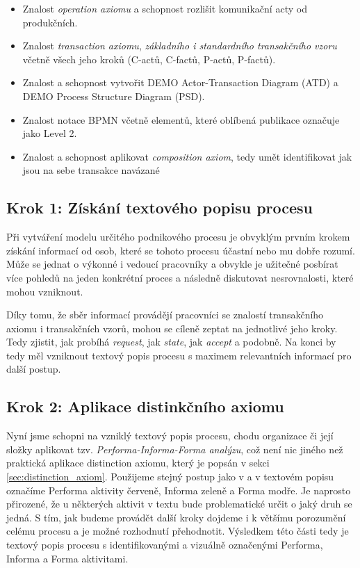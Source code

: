 \documentclass[]{article}
\begin{document}
\begin{itemize}
\item Znalost \textit{operation axiomu} a schopnost rozlišit komunikační acty od produkčních.
\item Znalost \textit{transaction axiomu}, \textit{základního i standardního transakčního vzoru} včetně všech jeho kroků (C-actů, C-factů, P-actů, P-factů).
\item Znalost a schopnost vytvořit DEMO Actor-Transaction Diagram (ATD) a DEMO Process Structure Diagram (PSD).
\item Znalost notace BPMN včetně elementů, které oblíbená publikace \cite{Silver2011} označuje jako Level 2.
\item Znalost a schopnost aplikovat \textit{composition axiom}, tedy umět identifikovat jak jsou na sebe transakce navázané
\end{itemize}

\subsection{Krok 1: Získání textového popisu procesu}
Při vytváření modelu určitého podnikového procesu je obvyklým prvním krokem získání informací od osob, které se tohoto procesu účastní nebo mu dobře rozumí. Může se jednat o výkonné i vedoucí pracovníky a obvykle je užitečné posbírat více pohledů na jeden konkrétní proces a následně diskutovat nesrovnalosti, které mohou vzniknout.

Díky tomu, že sběr informací provádějí pracovníci se znalostí transakčního axiomu i transakčních vzorů, mohou se cíleně zeptat na jednotlivé jeho kroky. Tedy zjistit, jak probíhá \textit{request}, jak \textit{state}, jak \textit{accept} a podobně. Na konci by tedy měl vzniknout textový popis procesu s maximem relevantních informací pro další postup.

\subsection{Krok 2: Aplikace distinkčního axiomu}
Nyní jsme schopni na vzniklý textový popis procesu, chodu organizace či její složky aplikovat tzv. \textit{Performa-Informa-Forma analýzu}, což není nic jiného než praktická aplikace distinction axiomu, který je popsán v sekci \ref{sec:distinction_axiom}. Použijeme stejný postup jako v \cite{Dietz2006} a v textovém popisu označíme Performa aktivity červeně, Informa zeleně a Forma modře. Je naprosto přirozené, že u některých aktivit v textu bude problematické určit o jaký druh se jedná. S tím, jak budeme provádět další kroky dojdeme i k většímu porozumění celému procesu a je možné rozhodnutí přehodnotit. Výsledkem této části tedy je textový popis procesu s identifikovanými a vizuálně označenými Performa, Informa a Forma aktivitami.
\end{document}
